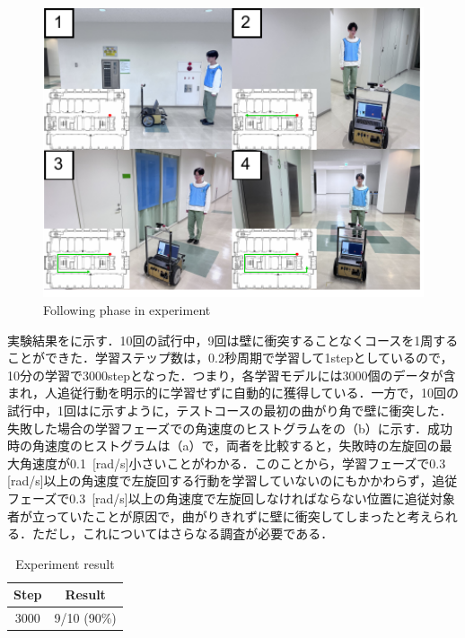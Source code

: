  \begin{figure}[h]
    \centering
    \includegraphics[width=12cm] {images/pdf/RobotGuidance_exp_test_phase}
    \captionsetup{justification=raggedright} %
    \caption{Following phase in experiment}
    \label{Fig:Following phase in experiment}
  \end{figure}

  実験結果をに示す．10回の試行中，9回は壁に衝突することなくコースを1周することができた．学習ステップ数は，0.2秒周期で学習して1stepとしているので，10分の学習で3000stepとなった．つまり，各学習モデルには3000個のデータが含まれ，人追従行動を明示的に学習せずに自動的に獲得している．一方で，10回の試行中，1回はに示すように，テストコースの最初の曲がり角で壁に衝突した．失敗した場合の学習フェーズでの角速度のヒストグラムをの（b）に示す．成功時の角速度のヒストグラムは（a）で，両者を比較すると，失敗時の左旋回の最大角速度が0.1\, [rad/s]小さいことがわかる．このことから，学習フェーズで0.3\, [rad/s]以上の角速度で左旋回する行動を学習していないのにもかかわらず，追従フェーズで0.3\, [rad/s]以上の角速度で左旋回しなければならない位置に追従対象者が立っていたことが原因で，曲がりきれずに壁に衝突してしまったと考えられる．ただし，これについてはさらなる調査が必要である．

  \begin{table}[h]
    \caption{Experiment result}
    \label{tab:Experiment result}
    \centering
    \begin{tabular}{|c|c|}
    \hline
    Step & Result      \\ \hline
    3000 & 9/10 (90\%) \\ \hline
    \end{tabular}
    \end{table}

